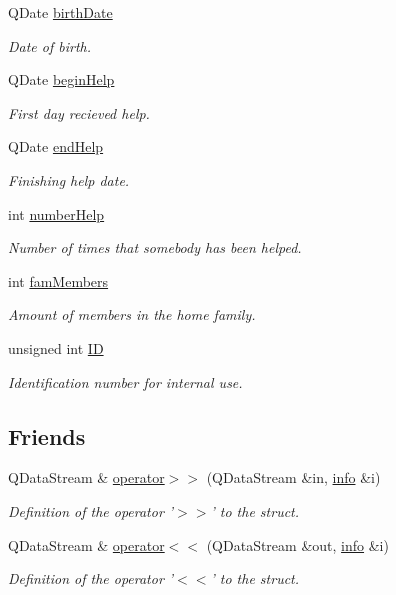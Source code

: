 \begin{DoxyCompactItemize}
Q\+Date \hyperlink{structinfo_a2269c62bc80419abee5ab99596715014}{birth\+Date}
\begin{DoxyCompactList}\small\item\em Date of birth. \end{DoxyCompactList}\item 
Q\+Date \hyperlink{structinfo_a860bf129937fda542024222bd425a224}{begin\+Help}
\begin{DoxyCompactList}\small\item\em First day recieved help. \end{DoxyCompactList}\item 
Q\+Date \hyperlink{structinfo_ac9af3f49f3357521492ffaf635897af4}{end\+Help}
\begin{DoxyCompactList}\small\item\em Finishing help date. \end{DoxyCompactList}\item 
int \hyperlink{structinfo_a96e373e7fbb00b84889fba5f87e23c6a}{number\+Help}
\begin{DoxyCompactList}\small\item\em Number of times that somebody has been helped. \end{DoxyCompactList}\item 
int \hyperlink{structinfo_a1b51e61437e4e0b422a49ad00b8a4e65}{fam\+Members}
\begin{DoxyCompactList}\small\item\em Amount of members in the home family. \end{DoxyCompactList}\item 
unsigned int \hyperlink{structinfo_a3c042f827b9847005666b1ecc5221549}{I\+D}
\begin{DoxyCompactList}\small\item\em Identification number for internal use. \end{DoxyCompactList}\end{DoxyCompactItemize}
\subsection*{Friends}
\begin{DoxyCompactItemize}
\item 
Q\+Data\+Stream \& \hyperlink{structinfo_aa1cff6f546458f788536a635780f7014}{operator$>$$>$} (Q\+Data\+Stream \&in, \hyperlink{structinfo}{info} \&i)
\begin{DoxyCompactList}\small\item\em Definition of the operator '$>$$>$' to the struct. \end{DoxyCompactList}\item 
Q\+Data\+Stream \& \hyperlink{structinfo_abc99bd8cbdd8d6f6ee6a15abc543fd26}{operator$<$$<$} (Q\+Data\+Stream \&out, \hyperlink{structinfo}{info} \&i)
\begin{DoxyCompactList}\small\item\em Definition of the operator '$<$$<$' to the struct. \end{DoxyCompactList}\end{DoxyCompactItemize}


